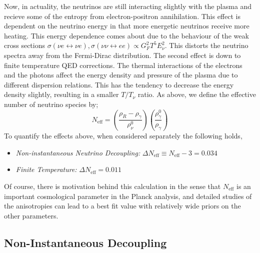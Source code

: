 \documentclass[11pt]{article}
\numberwithin{equation}{section}
\numberwithin{figure}{section}
\numberwithin{table}{section}
\begin{document}
Now, in actuality, the neutrinos are still interacting slightly with the plasma and recieve some of the entropy from electron-positron annihilation. This effect is dependent on the neutrino energy in that more energetic neutrinos receive more heating. This energy dependence comes about due to the behaviour of the weak cross sections $\sigma(\nu e \leftrightarrow \nu e), \sigma(\nu \nu \leftrightarrow ee) \propto G_F^2 T^5 E_\nu^2$. This distorts the neutrino spectra away from the Fermi-Dirac distribution. The second effect is down to finite temperature QED corrections. The thermal interactions of the electrons and the photons affect the energy density and pressure of the plasma due to different dispersion relations. This has the tendency to decrease the energy density slightly, resulting in a smaller $T/T_\nu$ ratio. As above, we define the effective number of neutrino species by;
\begin{equation}
N_{\mathrm{eff}} = \left(\frac{\rho_R - \rho_\gamma}{\rho_\nu^0}\right)\left(\frac{\rho_\gamma^0}{\rho_\gamma}\right)
\end{equation}
To quantify the effects above, when considered separately the following holds,
\begin{itemize}
\item \textit{Non-instantaneous Neutrino Decoupling:} $\Delta N_{\mathrm{eff}} \equiv N_{\mathrm{eff}} - 3 = 0.034$
\item \textit{Finite Temperature:} $\Delta N_{\mathrm{eff}} = 0.011$
\end{itemize}
Of course, there is motivation behind this calculation in the sense that $N_{\mathrm{eff}}$ is an important cosmological parameter in the Planck analysis, and detailed studies of the anisotropies can lead to a best fit value with relatively wide priors on the other parameters.


\subsection{Non-Instantaneous Decoupling}
\end{document}
